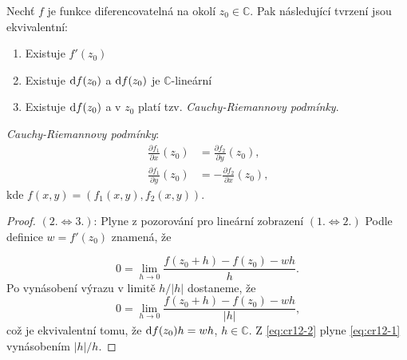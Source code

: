 
\begin{theorem}\label{CR}
Nechť $f$ je funkce diferencovatelná na okolí $z_0 \in \mathbb{C}$. Pak následující tvrzení jsou ekvivalentní:
\begin{enumerate}
    \item Existuje $f'(z_0)$ %
    \item Existuje $\mathop{}\!\mathrm{d} f(z_0)$ a $\mathop{}\!\mathrm{d} f(z_0)$ je $ \mathbb{C}$-lineární %
    \item Existuje $\mathop{}\!\mathrm{d} f(z_0)$ a v $z_0$ platí tzv. \emph{Cauchy-Riemannovy podmínky}. %
\end{enumerate}
\emph{Cauchy-Riemannovy podmínky}:
\begin{align*}
\tag{CR}
\label{eqn:CR}
\frac{\partial f_1}{\partial x}(z_0) &= \frac{\partial f_2}{\partial y}(z_0)\text{, }\\
\frac{\partial f_1}{\partial y}(z_0) &= -\frac{\partial f_2}{\partial x}(z_0)\text{,}    
\end{align*}
kde $f(x,y) = (f_1(x,y),f_2(x,y))$.

\end{theorem}
\begin{proof}
$(2. \iff 3.)$: Plyne z pozorování pro lineární zobrazení %
\newline
$(1. \iff 2.)$ Podle definice $w = f'(z_0)$ znamená, že 

\begin{equation}\label{eq:cr12-1} 
0 = \lim_{h \to 0} {\frac{f(z_0+h)-f(z_0)-wh}{h}}\text{.} 
\end{equation}
Po vynásobení výrazu v limitě $h/|h|$ dostaneme, že
\begin{equation}\label{eq:cr12-2}
0 = \lim_{h \to 0} \frac{f(z_0+h)-f(z_0)-wh}{|h|}\text{,}
\end{equation}%
což je ekvivalentní tomu, že  $\mathop{}\!\mathrm{d} f(z_0)h=wh$, $h\in \mathbb{C}$. Z \cref{eq:cr12-2} plyne \cref{eq:cr12-1} vynásobením $|h|/h$.
\end{proof}

